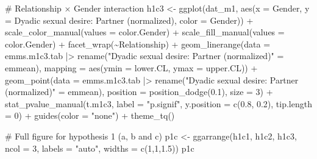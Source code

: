 \documentclass[
  bookmarksnumbered]{article}
\newenvironment{Shaded}{\begin{snugshade}}{\end{snugshade}}
\newcommand{\AttributeTok}[1]{\textcolor[rgb]{0.80,0.80,0.80}{#1}}
\newcommand{\CommentTok}[1]{\textcolor[rgb]{0.50,0.62,0.50}{#1}}
\newcommand{\DecValTok}[1]{\textcolor[rgb]{0.86,0.86,0.80}{#1}}
\newcommand{\FloatTok}[1]{\textcolor[rgb]{0.75,0.75,0.82}{#1}}
\newcommand{\FunctionTok}[1]{\textcolor[rgb]{0.94,0.94,0.56}{#1}}
\newcommand{\NormalTok}[1]{\textcolor[rgb]{0.80,0.80,0.80}{#1}}
\newcommand{\OtherTok}[1]{\textcolor[rgb]{0.94,0.94,0.56}{#1}}
\newcommand{\SpecialCharTok}[1]{\textcolor[rgb]{0.86,0.64,0.64}{#1}}
\newcommand{\StringTok}[1]{\textcolor[rgb]{0.80,0.58,0.58}{#1}}
\begin{document}
\begin{Shaded}
\begin{Highlighting}[]
\CommentTok{\# Relationship × Gender interaction}
\NormalTok{h1c3 }\OtherTok{\textless{}{-}} \FunctionTok{ggplot}\NormalTok{(dat\_m1, }\FunctionTok{aes}\NormalTok{(}\AttributeTok{x =}\NormalTok{ Gender, }\AttributeTok{y =} \StringTok{\textasciigrave{}}\AttributeTok{Dyadic sexual desire: Partner (normalized)}\StringTok{\textasciigrave{}}\NormalTok{, }
                           \AttributeTok{color =}\NormalTok{ Gender)) }\SpecialCharTok{+}
  \FunctionTok{scale\_color\_manual}\NormalTok{(}\AttributeTok{values =}\NormalTok{ color.Gender) }\SpecialCharTok{+}
  \FunctionTok{scale\_fill\_manual}\NormalTok{(}\AttributeTok{values =}\NormalTok{ color.Gender) }\SpecialCharTok{+}
  \FunctionTok{facet\_wrap}\NormalTok{(}\SpecialCharTok{\textasciitilde{}}\NormalTok{Relationship) }\SpecialCharTok{+}
  \FunctionTok{geom\_linerange}\NormalTok{(}\AttributeTok{data =}\NormalTok{ emms.m1c3.tab }\SpecialCharTok{|\textgreater{}} 
                  \FunctionTok{rename}\NormalTok{(}\StringTok{"Dyadic sexual desire: Partner (normalized)"} \OtherTok{=}\NormalTok{ emmean), }
                \AttributeTok{mapping =} \FunctionTok{aes}\NormalTok{(}\AttributeTok{ymin =}\NormalTok{ lower.CL, }\AttributeTok{ymax =}\NormalTok{ upper.CL)) }\SpecialCharTok{+}
  \FunctionTok{geom\_point}\NormalTok{(}\AttributeTok{data =}\NormalTok{ emms.m1c3.tab }\SpecialCharTok{|\textgreater{}} 
                  \FunctionTok{rename}\NormalTok{(}\StringTok{"Dyadic sexual desire: Partner (normalized)"} \OtherTok{=}\NormalTok{ emmean), }
             \AttributeTok{position =} \FunctionTok{position\_dodge}\NormalTok{(}\FloatTok{0.1}\NormalTok{), }
             \AttributeTok{size =} \DecValTok{3}\NormalTok{) }\SpecialCharTok{+}
  \FunctionTok{stat\_pvalue\_manual}\NormalTok{(t.m1c3, }
                     \AttributeTok{label =} \StringTok{"p.signif"}\NormalTok{, }
                     \AttributeTok{y.position =} \FunctionTok{c}\NormalTok{(}\FloatTok{0.8}\NormalTok{, }\FloatTok{0.2}\NormalTok{), }
                     \AttributeTok{tip.length =} \DecValTok{0}\NormalTok{) }\SpecialCharTok{+}
  \FunctionTok{guides}\NormalTok{(}\AttributeTok{color =} \StringTok{"none"}\NormalTok{) }\SpecialCharTok{+}
  \FunctionTok{theme\_tq}\NormalTok{()}

\CommentTok{\# Full figure for hypothesis 1 (a, b and c)}
\NormalTok{p1c }\OtherTok{\textless{}{-}} \FunctionTok{ggarrange}\NormalTok{(h1c1, h1c2, h1c3,}
                 \AttributeTok{ncol =} \DecValTok{3}\NormalTok{,}
                 \AttributeTok{labels =} \StringTok{"auto"}\NormalTok{,}
                 \AttributeTok{widths =} \FunctionTok{c}\NormalTok{(}\DecValTok{1}\NormalTok{,}\DecValTok{1}\NormalTok{,}\FloatTok{1.5}\NormalTok{))}
\NormalTok{p1c}
\end{Highlighting}
\end{Shaded}
\end{document}
